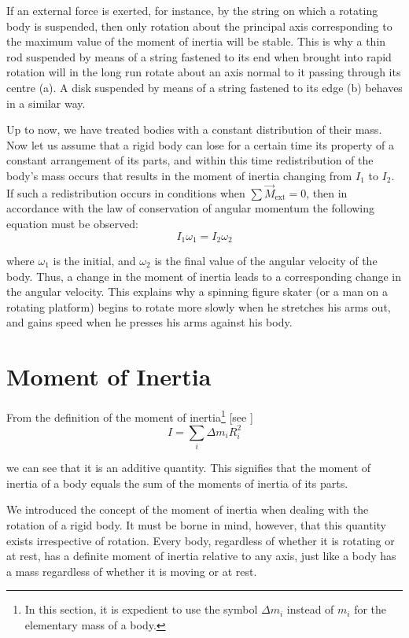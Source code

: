 If an external force is exerted, for instance, by the string on which a rotating body is suspended, then only rotation about the principal axis corresponding to the maximum value of the moment of inertia will be stable. This is why a thin rod suspended by means of a string fastened to its end when brought into rapid rotation will in the long run rotate about an axis normal to it passing through its centre (a). A disk suspended by means of a string fastened to its edge (b) behaves in a similar way. 

Up to now, we have treated bodies with a constant distribution of their mass. Now let us assume that a rigid body can lose for a certain time its property of a constant arrangement of its parts, and within this time redistribution of the body's mass occurs that results in the moment of inertia changing from $I_1$ to $I_2$. If such a redistribution occurs in conditions when $\sum\vec{M}_{\text{ext}}=0$, then in accordance with the law of conservation of angular momentum the following equation must be observed:
\begin{equation}\label{eq:5_16}
I_1\omega_1 = I_2\omega_2
\end{equation}

\noindent
where $\omega_1$ is the initial, and $\omega_2$ is the final value of the angular velocity of the body. Thus, a change in the moment of inertia leads to a corresponding change in the angular velocity. This explains why a spinning figure skater (or a man on a rotating platform) begins to rotate more slowly when he stretches his arms out, and gains speed when he presses his arms against his body.

\section{Moment of Inertia}\label{sec:5_4}

From the definition of the moment of inertia\footnote{In this section, it is expedient to use the symbol $\Delta m_i$ instead of $m_i$ for the elementary mass of a body.} [see ]
\begin{equation*}
I = \sum_i \Delta m_i R_i^2
\end{equation*}

\noindent
we can see that it is an additive quantity. This signifies that the moment of inertia of a body equals the sum of the moments of inertia of its parts.

We introduced the concept of the moment of inertia when dealing with the rotation of a rigid body. It must be borne in mind, however, that this quantity exists irrespective of rotation. Every body, regardless of whether it is rotating or at rest, has a definite moment of inertia relative to any axis, just like a body has a mass regardless of whether it is moving or at rest.

